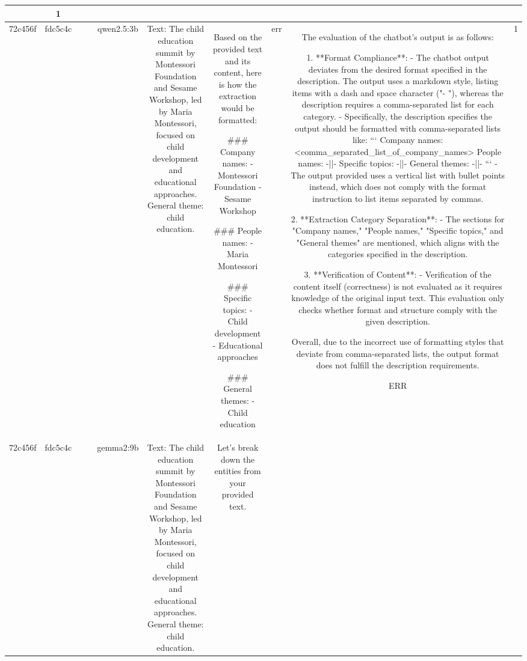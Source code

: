 \begin{table}[h!]
\begin{tabular}{|c|c|c|c|c|c|c|c|c|c|}
{OK & 1\\
\hline
72c456f & fdc5c4c &  &  & qwen2.5:3b & Text: The child education summit by Montessori Foundation and Sesame Workshop, led by Maria Montessori, focused on child development and educational approaches. General theme: child education. & Based on the provided text and its content, here is how the extraction would be formatted:

### Company names:
- Montessori Foundation  
- Sesame Workshop

### People names:
- Maria Montessori

### Specific topics:
- Child development  
- Educational approaches

### General themes:
- Child education & err & The evaluation of the chatbot's output is as follows:

1. **Format Compliance**:
   - The chatbot output deviates from the desired format specified in the description. The output uses a markdown style, listing items with a dash and space character ("- "), whereas the description requires a comma-separated list for each category. 
   - Specifically, the description specifies the output should be formatted with comma-separated lists like:
     ```
     Company names: <comma_separated_list_of_company_names>
     People names: -||-
     Specific topics: -||-
     General themes: -||-
     ```
   - The output provided uses a vertical list with bullet points instead, which does not comply with the format instruction to list items separated by commas.

2. **Extraction Category Separation**:
   - The sections for "Company names," "People names," "Specific topics," and "General themes" are mentioned, which aligns with the categories specified in the description. 

3. **Verification of Content**:
   - Verification of the content itself (correctness) is not evaluated as it requires knowledge of the original input text. This evaluation only checks whether format and structure comply with the given description.

Overall, due to the incorrect use of formatting styles that deviate from comma-separated lists, the output format does not fulfill the description requirements.

ERR & 1\\
\hline
72c456f & fdc5c4c &  &  & gemma2:9b & Text: The child education summit by Montessori Foundation and Sesame Workshop, led by Maria Montessori, focused on child development and educational approaches. General theme: child education. & Let's break down the entities from your provided text. 

}
\end{tabular}
\end{table}
